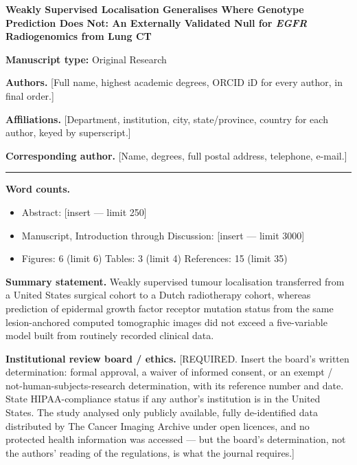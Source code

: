 \documentclass[11pt]{article}
\begin{document}
\begin{center}
{\Large\bfseries Weakly Supervised Localisation Generalises Where Genotype
Prediction Does Not: An Externally Validated Null for \textit{EGFR}
Radiogenomics from Lung CT\par}
\end{center}

\vspace{0.5em}
\noindent\textbf{Manuscript type:} Original Research

\medskip
\noindent\textbf{Authors.} [Full name, highest academic degrees, ORCID iD for
every author, in final order.]

\noindent\textbf{Affiliations.} [Department, institution, city, state/province,
country for each author, keyed by superscript.]

\noindent\textbf{Corresponding author.} [Name, degrees, full postal address,
telephone, e-mail.]

\bigskip
\hrule
\bigskip

\noindent\textbf{Word counts.}
\begin{itemize}\itemsep0pt
  \item Abstract: [insert --- limit 250]
  \item Manuscript, Introduction through Discussion: [insert --- limit 3000]
  \item Figures: 6 (limit 6) \quad Tables: 3 (limit 4) \quad References: 15
    (limit 35)
\end{itemize}

\bigskip
\noindent\textbf{Summary statement.}
Weakly supervised tumour localisation transferred from a United States surgical
cohort to a Dutch radiotherapy cohort, whereas prediction of epidermal growth
factor receptor mutation status from the same lesion-anchored computed
tomographic images did not exceed a five-variable model built from routinely
recorded clinical data.

\bigskip
\noindent\textbf{Institutional review board / ethics.}
[REQUIRED. Insert the board's written determination: formal approval, a waiver of
informed consent, or an exempt / not-human-subjects-research determination, with
its reference number and date. State HIPAA-compliance status if any author's
institution is in the United States. The study analysed only publicly available,
fully de-identified data distributed by The Cancer Imaging Archive under open
licences, and no protected health information was accessed --- but the board's
determination, not the authors' reading of the regulations, is what the journal
requires.]
\end{document}
